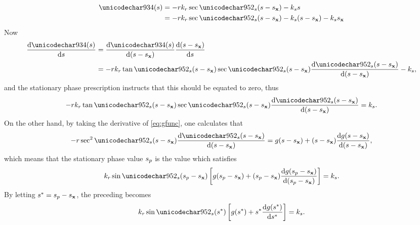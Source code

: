 \begin{equation}
\begin{split}
 \Phi(\parm) &= -\targetrange\kr\sec\thetas(\parm-\targetxparm) - \kparm\parm\\
 &= -\targetrange\kr\sec\thetas(\parm-\targetxparm) - \kparm(\parm-\targetxparm) - \kparm\targetxparm
 \end{split}
 \label{eq:stationaryPhasePhase}
\end{equation}
Now
\begin{equation}
\begin{split}
 \frac{\d\Phi(\parm)}{\d\parm} &= \frac{\d\Phi(\parm)}{\d(\parm-\targetxparm)}\frac{\d(\parm-\targetxparm)}{\d\parm}\\
 &=-\targetrange\kr\tan\thetas(\parm-\targetxparm)\sec\thetas(\parm-\targetxparm)\frac{\d\thetas(\parm-\targetxparm)}{\d(\parm-\targetxparm)} -\kparm,
 \end{split}
\end{equation}
and the stationary phase prescription instructs that this should be equated to zero, thus
\begin{equation}
\begin{split}
 -\targetrange\kr\tan\thetas(\parm-\targetxparm)\sec\thetas(\parm-\targetxparm)\frac{\d\thetas(\parm-\targetxparm)}{\d(\parm-\targetxparm)} = \kparm.
 \end{split}
\end{equation}
On the other hand, by taking the derivative of \eqref{eq:gfunc}, one calculates that
\begin{equation}
 -\targetrange\sec^2\thetas(\parm-\targetxparm)\frac{\d\thetas(\parm-\targetxparm)}{\d(\parm-\targetxparm)} = \gfunc(\parm-\targetxparm) + (\parm-\targetxparm)\frac{\d\gfunc(\parm-\targetxparm)}{\d(\parm-\targetxparm)},
\end{equation}
which means that the stationary phase value $s_p$ is the value which satisfies
\begin{equation}
 \kr\sin\thetas(\stationaryparm-\targetxparm)\left[\gfunc(\stationaryparm-\targetxparm) + (\stationaryparm-\targetxparm)\frac{\d\gfunc(\stationaryparm-\targetxparm)}{\d(\stationaryparm-\targetxparm)}\right] = \kparm.
\end{equation}
By letting $s^* = s_p - s_{\mathbf{x}}$, the preceding becomes
\begin{equation}
 \kr\sin\thetas(\myparm)\left[\gfunc(\myparm) + \myparm\frac{\d\gfunc(\myparm)}{\d\myparm}\right] = \kparm.
 \label{eq:stationaryAngleRelation}
\end{equation}
